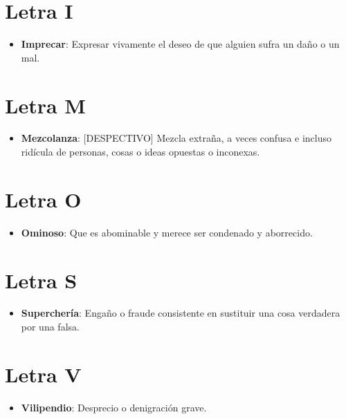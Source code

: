 \documentclass[11pt,a4paper]{article}
\newcommand{\palabra}[1]{\item \textbf{#1}}
\begin{document}
\section{Letra I}
\begin{itemize}
	\palabra{Imprecar}: Expresar vivamente el deseo de que alguien sufra un daño o un mal.
\end{itemize}

\section{Letra M}
\begin{itemize}
	\palabra{Mezcolanza}: [DESPECTIVO] Mezcla extraña, a veces confusa e incluso ridícula de personas, cosas o ideas opuestas o inconexas.
\end{itemize}

\section{Letra O}
\begin{itemize}
	\palabra{Ominoso}: Que es abominable y merece ser condenado y aborrecido.
\end{itemize}

\section{Letra S}
\begin{itemize}
	\palabra{Superchería}: Engaño o fraude consistente en sustituir una cosa verdadera por una falsa.
\end{itemize}

\section{Letra V}
\begin{itemize}
	\palabra{Vilipendio}: Desprecio o denigración grave.
\end{itemize}
\end{document}
